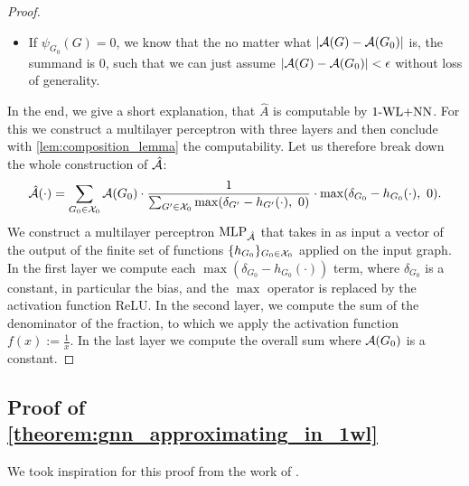 \begin{proof}
\begin{itemize}
        \item If $\psi_{G_0}(G) = 0$, we know that the no matter what $|\mathcal{A}(G) - \mathcal{A}(G_0)|$ is, the summand is $0$, such that we can just assume $|\mathcal{A}(G) - \mathcal{A}(G_0)| < \epsilon$ without loss of generality.
    \end{itemize}
    In the end, we give a short explanation, that $\hat{A}$ is computable by $\text{1-WL+NN}$. For this we construct a multilayer perceptron with three layers and then conclude with \cref{lem:composition_lemma} the computability. Let us therefore break down the whole construction of $\hat{\mathcal{A}}$:
    \begin{eqnarray*}
        \hat{\mathcal{A}}(\cdot) = \sum_{G_0 \in \mathcal{X}_0} \mathcal{A}(G_0) \cdot \frac{1}{\sum_{G' \in \mathcal{X}_0} \max(\delta_{G'} -  h_{G'}(\cdot), \ 0)} \cdot \max(\delta_{G_0} -  h_{G_0}(\cdot), \ 0).
    \end{eqnarray*}
    We construct a multilayer perceptron $\text{MLP}_{\hat{\mathcal{A}}}$ that takes in as input a vector of the output of the finite set of functions $\{ h_{G_0} \}_{G_0 \in \mathcal{X}_0}$ applied on the input graph. In the first layer we compute each $\max(\delta_{G_0} -  h_{G_0}(\cdot))$ term, where $\delta_{G_0}$ is a constant, in particular the bias, and the $\max$ operator is replaced by the activation function ReLU. In the second layer, we compute the sum of the denominator of the fraction, to which we apply the activation function $f(x) := \frac{1}{x}$. In the last layer we compute the overall sum where $\mathcal{A}(G_0)$ is a constant.
\end{proof}

\subsection{Proof of \cref{theorem:gnn_approximating_in_1wl}}
We took inspiration for this proof from the work of \cite{Chen2019}.

